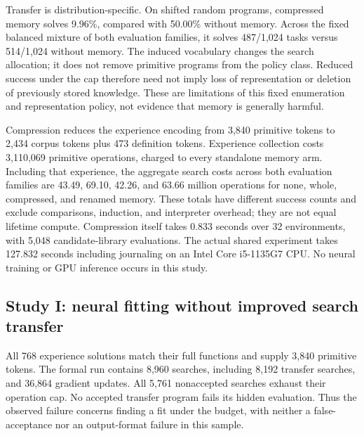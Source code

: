 \documentclass[11pt]{article}
\begin{document}
Transfer is distribution-specific. On shifted random programs, compressed
memory solves 9.96\%, compared with 50.00\% without memory. Across the fixed
balanced mixture of both evaluation families, it solves 487/1,024 tasks
versus 514/1,024 without memory. The induced vocabulary changes the search
allocation; it does not remove primitive programs from the policy class.
Reduced success under the cap therefore need not imply loss of representation
or deletion of previously stored knowledge. These are limitations of this
fixed enumeration and representation policy, not evidence that memory is
generally harmful.

Compression reduces the experience encoding from 3,840 primitive tokens to
2,434 corpus tokens plus 473 definition tokens. Experience collection costs
3,110,069 primitive operations, charged to every standalone memory arm.
Including that experience, the aggregate search costs across both evaluation
families are 43.49, 69.10, 42.26, and 63.66 million operations for none,
whole, compressed, and renamed memory. These totals have different success
counts and exclude comparisons, induction, and interpreter overhead; they
are not equal lifetime compute. Compression itself takes 0.833 seconds over
32 environments, with 5,048 candidate-library evaluations. The actual shared
experiment takes 127.832 seconds including journaling on an Intel
Core i5-1135G7 CPU. No neural training or GPU inference occurs in this study.

\subsection{Study I: neural fitting without improved search transfer}
All 768 experience solutions match their full functions and supply 3,840
primitive tokens. The formal run contains 8,960 searches, including 8,192
transfer searches, and 36,864 gradient updates. All 5,761 nonaccepted searches
exhaust their operation cap. No accepted transfer program fails its hidden
evaluation. Thus the observed failure concerns finding a fit under the budget,
with neither a false-acceptance nor an output-format failure in this sample.
\end{document}
